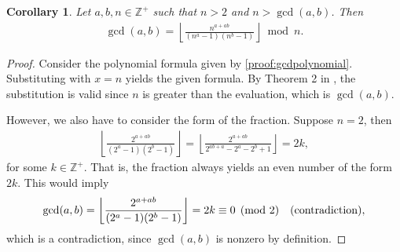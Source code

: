 \documentclass[11pt,reqno]{article}
\theoremstyle{plain}
\newtheorem{corollary}[theorem]{Corollary}
\theoremstyle{definition}
\newcommand{\floor}[1]{\left\lfloor #1 \right\rfloor}
\newcommand{\Z}{\mathbb{Z}}
\begin{document}
\begin{corollary} \label{proof:gcdintegerbase}
Let $a,b,n \in \Z^+$ such that $n > 2$ and $n > \gcd(a,b)$. Then
\begin{align*}
\gcd(a,b) = \floor{\frac{n^{a+ab}}{(n^a-1)(n^b-1)}}\bmod n .
\end{align*}
\end{corollary}
\begin{proof}
Consider the polynomial formula given by \cref{proof:gcdpolynomial}. Substituting with $x = n$ yields the given formula. By Theorem 2 in  \cite{shunia2024polynomial}, the substitution is valid since $n$ is greater than the evaluation, which is $\gcd(a,b)$.

However, we also have to consider the form of the fraction. Suppose $n = 2$, then
\begin{align*}
\floor{\frac{2^{a+ab}}{(2^a-1)(2^b-1)}}
= \floor{\frac{2^{a+ab}}{2^{ab+a} - 2^a - 2^b + 1}} = 2k ,
\end{align*}
for some $k \in \Z^+$. That is, the fraction always yields an even number of the form $2k$. This would imply
\begin{align*}
\gcd(a,b) = \floor{\frac{2^{a+ab}}{(2^a-1)(2^b-1)}} = 2k \equiv 0 \pmod 2 \quad \textup{(contradiction)} ,
\end{align*}
which is a contradiction, since $\gcd(a,b)$ is nonzero by definition.
\end{proof}
\end{document}
